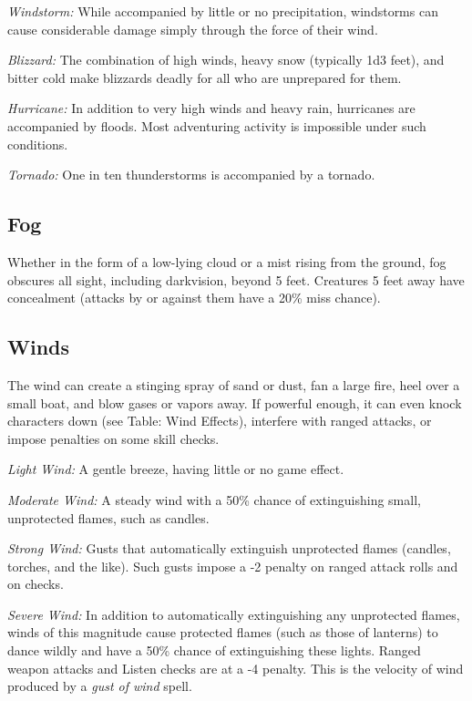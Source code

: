 \textit{Windstorm:} While accompanied by little or no precipitation, windstorms 
can cause considerable damage simply through the force of their wind.

\textit{Blizzard:} The combination of high winds, heavy snow (typically 1d3 feet), 
and bitter cold make blizzards deadly for all who are unprepared for them.

\textit{Hurricane:} In addition to very high winds and heavy rain, hurricanes are 
accompanied by floods. Most adventuring activity is impossible under such conditions.

\textit{Tornado:} One in ten thunderstorms is accompanied by a tornado.

\subsection{Fog}

Whether in the form of a low-lying cloud or a mist rising from the ground, fog 
obscures all sight, including darkvision, beyond 5 feet. Creatures 5 feet away 
have concealment (attacks by or against them have a 20\% miss chance).

\subsection{Winds}

The wind can create a stinging spray of sand or dust, fan a large fire, heel over 
a small boat, and blow gases or vapors away. If powerful enough, it can even knock 
characters down (see Table: Wind Effects), interfere with ranged attacks, or impose 
penalties on some skill checks.

\textit{Light Wind:} A gentle breeze, having little or no game effect.

\textit{Moderate Wind:} A steady wind with a 50\% chance of extinguishing small, 
unprotected flames, such as candles.

\textit{Strong Wind:} Gusts that automatically extinguish unprotected flames (candles, 
torches, and the like). Such gusts impose a -2 penalty on ranged attack rolls and 
on  checks.

\textit{Severe Wind:} In addition to automatically extinguishing any unprotected 
flames, winds of this magnitude cause protected flames (such as those of lanterns) 
to dance wildly and have a 50\% chance of extinguishing these lights. Ranged weapon 
attacks and Listen checks are at a -4 penalty. This is the velocity of wind produced 
by a \textit{gust of wind }spell.

